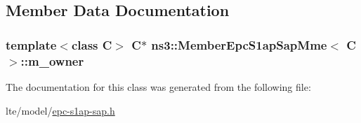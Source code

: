 \subsection{Member Data Documentation}
\subsubsection[{\texorpdfstring{m\+\_\+owner}{m_owner}}]{\setlength{\rightskip}{0pt plus 5cm}template$<$class C$>$ {\bf C}$\ast$ {\bf ns3\+::\+Member\+Epc\+S1ap\+Sap\+Mme}$<$ {\bf C} $>$\+::m\+\_\+owner\hspace{0.3cm}{\ttfamily [private]}}\hypertarget{classns3_1_1MemberEpcS1apSapMme_a3fa690cba6281cc72e6e0bb177bdc679}{}\label{classns3_1_1MemberEpcS1apSapMme_a3fa690cba6281cc72e6e0bb177bdc679}


The documentation for this class was generated from the following file\+:\begin{DoxyCompactItemize}
\item 
lte/model/\hyperlink{epc-s1ap-sap_8h}{epc-\/s1ap-\/sap.\+h}\end{DoxyCompactItemize}
